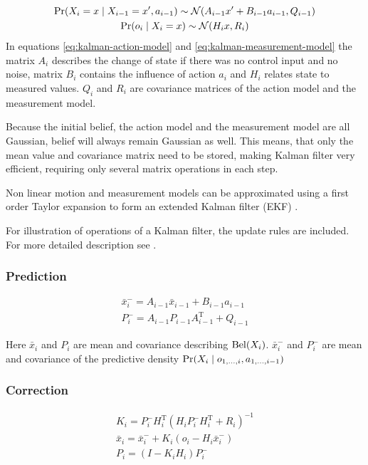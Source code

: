 \begin{gather}
	\label{eq:kalman-action-model}
	\operatorname{\mathrm{Pr}}(X_i = x \mid X_{i-1} = x', a_{i - 1}) \sim \mathcal{N}(A_{i - 1}x' + B_{i - 1}a_{i - 1}, Q_{i - 1})
	\\
	\label{eq:kalman-measurement-model}
	\operatorname{\mathrm{Pr}}(o_{i} \mid X_i = x) \sim \mathcal{N}(H_{i}x, R_i)
\end{gather}
In equations \eqref{eq:kalman-action-model} and \eqref{eq:kalman-measurement-model}
the matrix \(A_i\) describes the change of state if there was no control input and no noise,
matrix \(B_i\) contains the influence of action \(a_i\) and \(H_i\) relates state to measured
values.
\(Q_i\) and \(R_i\) are covariance matrices of the action model and the measurement model.

Because the initial belief, the action model and the measurement model are all Gaussian,
belief will always remain Gaussian as well.
This means, that only the mean value and covariance matrix need to be stored, making
Kalman filter very efficient, requiring only several matrix operations in each step.

Non linear motion and measurement models can be approximated
using a first order Taylor expansion to form an extended Kalman
filter (EKF) \cite{welch95}.

For illustration of operations of a Kalman filter, the update rules are included.
For more detailed description see \cite{welch95}.

\subsubsection{Prediction}
\begin{gather}
	\bar{x}^{-}_i = A_{i - 1}\bar{x}_{i-1} + B_{i - 1}a_{i - 1}
	\\
	P^{-}_i = A_{i - 1}P_{i - 1}A^{\mathrm{T}}_{i - 1} + Q_{i - 1}
\end{gather}

Here \(\bar{x}_i\) and \(P_i\) are mean and covariance describing \(\operatorname{\mathrm{Bel}}(X_i)\).
\(\bar{x}^{-}_i\) and \(P^{-}_i\) are mean and covariance of the predictive density
\(\operatorname{\mathrm{Pr}}(X_i \mid o_{1, \dotsc, i}, a_{1, \dotsc, i - 1})\)

\subsubsection{Correction}
\begin{gather}
	\label{eq:kalman-gain}
	K_i = P^{-}_{i}H^{\mathrm{T}}_{i}(H_{i}P^{-}_{i}H^{\mathrm{T}}_{i} + R_{i})^{-1}
	\\
	\bar{x}_i = \bar{x}^{-}_i + K_i (o_i - H_{i}\bar{x}^{-}_i)
	\\
	P_i = (I - K_{i}H_{i})P^{-}_i
\end{gather}



